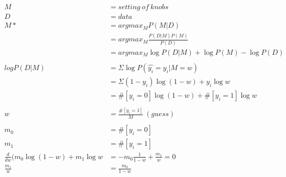 \documentclass[10pt]{article}
\begin{document}
\begin{align*}M & = setting\ of\ knobs \\
D & = data \\
M* & = argmax_M P(M|D) \\
& = argmax_M \frac{P(D|M)P(M)}{P(D)} \\
& = argmax_M \log P(D|M) + \log P(M) - \log P(D) \\
\\
log P(D|M) & = \Sigma \log P(\hat{y_i} = y_i | M = w) \\
& = \Sigma(1 - y_i) \log (1 - w) + y_i \log w \\
& = \#[y_i = 0] \log(1 - w) + \#[y_i = 1] \log w \\
\\
w & = \frac{\#[y_i = 1]}{M}\  (guess) \\
\\
m_0 & = \#[y_i = 0] \\
m_1 & = \#[y_i = 1] \\
\frac{d}{dw}(m_0 \log (1 - w) + m_1 \log w
& = -m_0 \frac{1}{1-w} + \frac{m_1}{w} = 0 \\
\frac{m_1}{w} & = \frac{m_0}{1-w}\end{align*}
\end{document}
